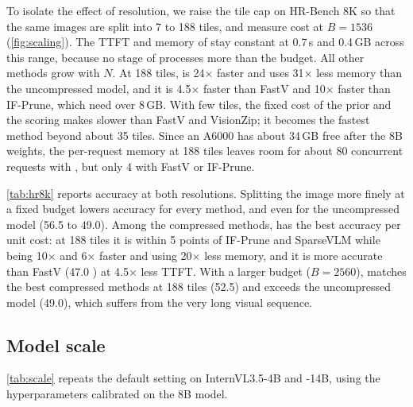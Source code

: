 

To isolate the effect of resolution, we raise the tile cap on HR-Bench 8K so that the same images are
split into 7 to 188 tiles, and measure cost at $B=1536$ (\cref{fig:scaling}). The TTFT and memory of
\method stay constant at 0.7\,s and 0.4\,GB across this range, because no stage of \method processes
more than the budget. All other methods grow with $N$. At 188 tiles, \method is 24$\times$ faster and
uses 31$\times$ less memory than the uncompressed model, and it is 4.5$\times$ faster than FastV and
10$\times$ faster than IF-Prune, which need over 8\,GB. With few tiles, the fixed cost of the prior and
the scoring makes \method slower than FastV and VisionZip; it becomes the fastest method beyond about
35 tiles. Since an A6000 has about 34\,GB free after the 8B weights, the per-request memory at 188
tiles leaves room for about 80 concurrent requests with \method, but only 4 with FastV or IF-Prune.

\cref{tab:hr8k} reports accuracy at both resolutions. Splitting the image more finely at a fixed budget
lowers accuracy for every method, and even for the uncompressed model (56.5 to 49.0). Among the
compressed methods, \method has the best accuracy per unit cost: at 188 tiles it is within 5 points of
IF-Prune and SparseVLM while being 10$\times$ and 6$\times$ faster and using 20$\times$ less memory, and
it is more accurate than FastV (47.0 ) at 4.5$\times$ less TTFT. With a larger budget
($B=2560$), \method matches the best compressed methods at 188 tiles (52.5) and exceeds the uncompressed
model (49.0), which suffers from the very long visual sequence.

\subsection{Model scale}
\label{sec:scale}



\cref{tab:scale} repeats the default setting on InternVL3.5-4B and -14B, using the hyperparameters
calibrated on the 8B model.

